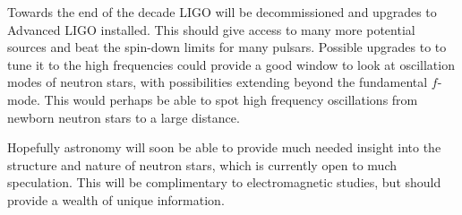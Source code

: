 Towards the end of the decade LIGO will be decommissioned and upgrades to Advanced LIGO installed.
This should give access to many more potential sources and beat the spin-down limits for many
pulsars. Possible upgrades to \geo to tune it to the high frequencies could provide a good window
to look at oscillation modes of neutron stars, with possibilities extending beyond the fundamental
$f$-mode. This would perhaps be able to spot high frequency oscillations from newborn neutron stars
to a large distance.

Hopefully \gw astronomy will soon be able to provide much needed insight into the structure and
nature of neutron stars, which is currently open to much speculation. This will be complimentary
to electromagnetic studies, but should provide a wealth of unique information.